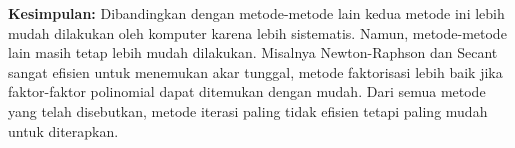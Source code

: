 \documentclass{article}
\begin{document}
\begin{enumerate}
    \textbf{Kesimpulan: } Dibandingkan dengan metode-metode lain kedua metode ini lebih mudah dilakukan oleh komputer karena lebih sistematis.
    Namun, metode-metode lain masih tetap lebih mudah dilakukan. Misalnya Newton-Raphson dan Secant sangat efisien untuk menemukan akar tunggal, metode faktorisasi lebih baik jika faktor-faktor polinomial dapat ditemukan dengan mudah. Dari semua metode yang telah disebutkan, metode iterasi paling tidak efisien tetapi paling mudah untuk diterapkan.

\end{enumerate}
\end{document}

